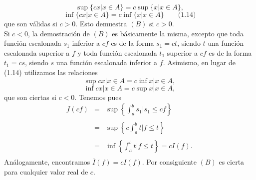\begin{multicols}{2}
\begin{teo}
    $$\sup \lbrace cx | x\in A \rbrace = c \sup \lbrace x|x\in A \rbrace,$$ $$ \inf \lbrace c x | x \in A\rbrace = c \inf\lbrace x|x\in A \rbrace \qquad \mbox{(1.14)}$$
    que son válidas si $c>0$. Esto demuestra $(B)$ si $c>0$.\\
    Si $c<0$, la demostración de $(B)$ es básicamente la misma, excepto que toda función escalonada $s_1$ inferior a $cf$ es de la forma $s_1=ct$, siendo $t$ una función escalonada superior a $f$ y toda función escalonada $t_1$ superior a $cf$ es de la forma $t_1=cs$, siendo $s$ una función escalonada inferior a $f$. Asimismo, en lugar de (1.14) utilizamos las relaciones 
    $$\sup{cx | x\in A} = c\inf{x | x \in A},$$ $$ \inf{cx | x \in A} = c \sup {x | x \in A},$$
    que son ciertas si $c<0$. Tenemos pues 
    $$\begin{array}{rcl}
	\underbar{I}(cf) &=& \sup\left\{\int_a^b s_1 | s_1 \leq cf\right\}\\\\
			 &=& \sup \left\{c \int_a^b t | f \leq t\right\}\\\\
			 &=& \inf \left\{\int_a^b t | f \leq t\right\} = cI(f).\\
    \end{array}$$
    Análogamente, encontramos $\bar{I}(f)=cI(f)$. Por consiguiente $(B)$ es cierta para cualquier valor real de $c$.\\\\

\end{teo}


\end{multicols}
